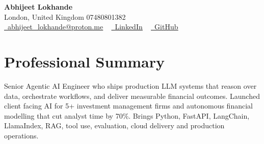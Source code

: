\documentclass[a4paper,10pt]{article}
\begin{document}
    \begin{center}
        {\Huge\bfseries Abhijeet Lokhande}
        \\[2pt] {\color{muted}London, United Kingdom \textbar{} 07480801382}\\
        \small
        \href{mailto:abhijeet_lokhande@proton.me}{\raisebox{-0.2\height}{\color{primary}\faEnvelope}\  \underline{abhijeet\_lokhande@proton.me}} ~
        \href{https://www.linkedin.com/in/ablds/}{\raisebox{-0.2\height}{\color{primary}\faLinkedin}\ \underline{LinkedIn}}  ~
        \href{https://github.com/abhijeetscode}{\raisebox{-0.2\height}{\color{primary}\faGithub}\ \underline{GitHub}}
    \end{center}

\section{Professional Summary}
\vspace{-5pt}
{\color{muted}Senior Agentic AI Engineer who ships production LLM systems that reason over data, orchestrate workflows, and deliver measurable financial outcomes. Launched client facing AI for 5+ investment management firms and autonomous financial modelling that cut analyst time by 70\%. Brings Python, FastAPI, LangChain, LlamaIndex, RAG, tool use, evaluation, cloud delivery and production operations.}
\vspace{2pt}

\end{document}
